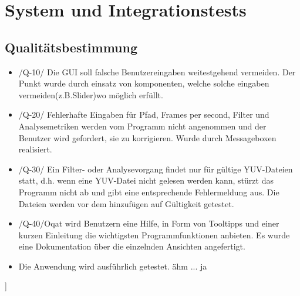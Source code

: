 \chapter{System und Integrationstests}
\section{Qualitätsbestimmung}
\begin{itemize}
\item /Q-10/ Die GUI soll falsche Benutzereingaben weitestgehend vermeiden. \newline
Der Punkt wurde durch einsatz von komponenten, welche solche eingaben vermeiden(z.B.Slider)wo möglich erfüllt.
\item /Q-20/ Fehlerhafte Eingaben für Pfad, Frames per second, Filter und Analysemetriken werden vom Programm nicht angenommen und der Benutzer wird gefordert, sie zu korrigieren. \newline
Wurde durch Messageboxen realisiert.
\item /Q-30/ Ein Filter- oder Analysevorgang findet nur für gültige YUV-Dateien statt, d.h. wenn eine YUV-Datei nicht gelesen werden kann, stürzt das Programm nicht ab und gibt eine entsprechende Fehlermeldung aus. \newline
Die Dateien werden vor dem hinzufügen auf Gültigkeit getestet.
\item  /Q-40/Oqat wird Benutzern eine Hilfe, in Form von Tooltipps und einer kurzen Einleitung die wichtigsten Programmfunktionen anbieten. \newline
Es wurde eine Dokumentation über die einzelnden Ansichten angefertigt.
\item Die Anwendung wird ausführlich getestet. \newline
ähm ... ja
\end{itemize}]
